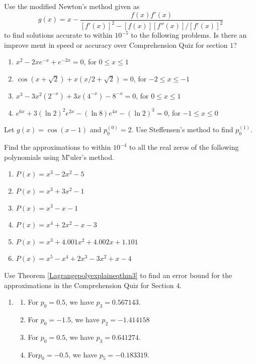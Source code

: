 \begin{posttest}[\textcolor{red}{End of Module 2 Quiz}]
\item Use the modified Newton’s method given as 
\[g(x)=x-\frac{f(x)f'(x)}{{[f'(x)]^2-[f(x)][f''(x)]}/[f'(x)]^2}\]
to find solutions accurate to within $10^{-5}$ to the following problems. Is there an improve
ment in speed or accuracy over Comprehension Quiz for section $1$?
\begin{enumerate}[label=(\alph*)]
\item $x^2 -2xe^{-x} +e^{-2x} = 0$, for $0\leq x \leq1$
\item  $\cos(x + \sqrt{2})+x(x/2+\sqrt{2}) = 0$, for $-2 \leq x \leq-1$
\item $x^3 -3x^2(2^{-x}) + 3x(4^{-x}) - 8^{-x} = 0$, for $0 \leq x \leq 1$
\item $e^{6x} + 3(\ln2)^2e^{2x} - (\ln8)e^{4x} - (\ln2)^3 = 0$, for $-1 \leq x \leq 0$
\end{enumerate}
\item Let $g(x) = \cos(x -1)$ and $p^{(0)}_0 =2$. Use Steffensen’s method to find $p^{(1)}_0$.
\item Find the approximations to within $10^{-4}$ to all the real zeros of the following polynomials using M\''uler's method.
\begin{enumerate}[label=(\alph*)]
\item $P(x)=x^{3}-2 x^{2}-5$
\item $P(x)=x^{3}+3 x^{2}-1$
\item $P(x)=x^{3}- x-1$
\item $P(x)=x^{4}+2 x^{2}-x-3$
\item $P(x)=x^{3}+4.001 x^{2}+4.002x+1.101$
\item $P(x)=x^{5}-x^{4}+2 x^{3}-3 x^{2}+x-4$
\end{enumerate}
\item Use Theorem \ref{Lagrangepolyexplaineqthm3} to find an error bound for the approximations in the Comprehension Quiz for Section $4$.
\begin{mysolution}
\begin{enumerate}[label=\arabic*.]
\item
\begin{enumerate}[label=(\alph*)]
\item For $p_0=0.5$, we have $p_{3}=0.567143$.
\item For $p_0=-1.5$, we have $p_{2}=-1.414158$
\item For $p_0=0.5$, we have $p_3=0.641274$.
\item For$p_0=-0.5$, we have $p_5=-0.183319$.

\end{enumerate}
\end{enumerate}
\end{mysolution}
\end{posttest}

